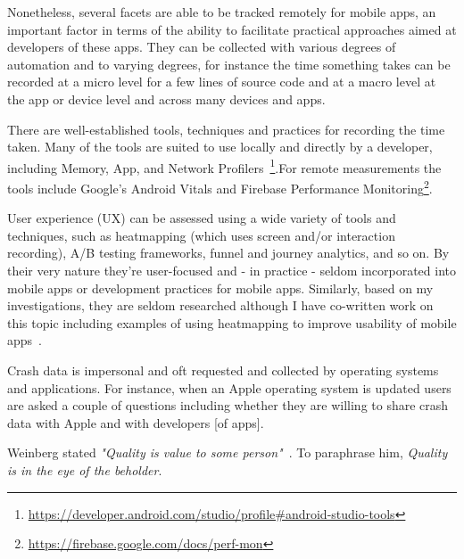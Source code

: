 Nonetheless, several facets are able to be tracked remotely for mobile apps, an important factor in terms of the ability to facilitate practical approaches aimed at developers of these apps. They can be collected with various degrees of automation and to varying degrees, for instance the time something takes can be recorded at a micro level for a few lines of source code and at a macro level at the app or device level and across many devices and apps. 

There are well-established tools, techniques and practices for recording the time taken. Many of the tools are suited to use locally and directly by a developer, including Memory, App, and Network Profilers~\footnote{\url{https://developer.android.com/studio/profile\#android-studio-tools}}.For remote measurements the tools include Google's Android Vitals and Firebase Performance Monitoring\footnote{\url{https://firebase.google.com/docs/perf-mon}}.

User experience (UX) can be assessed using a wide variety of tools and techniques, such as heatmapping (which uses screen and/or interaction recording), A/B testing frameworks, funnel and journey analytics, and so on. By their very nature they're user-focused and - in practice - seldom incorporated into mobile apps or development practices for mobile apps. Similarly, based on my investigations, they are seldom researched although I have co-written work on this topic including examples of using heatmapping to improve usability of mobile apps~\cite{harty_aymer_playbook_2016}.


Crash data is impersonal and oft requested and collected by operating systems and applications. For instance, when an Apple operating system is updated users are asked a couple of questions including whether they are willing to share crash data with Apple and with developers [of apps].

Weinberg stated \emph{"Quality is value to some person"}~\cite{weinberg1992quality}. To paraphrase him, \emph{Quality is in the eye of the beholder}.


